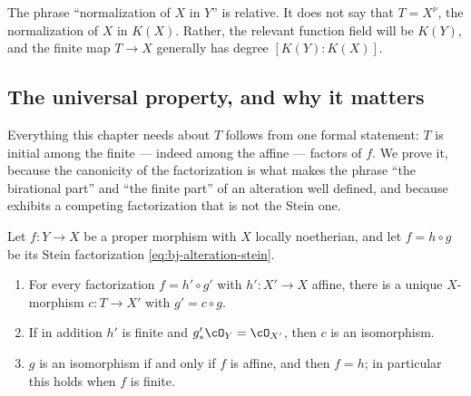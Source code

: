 The phrase ``normalization of $X$ in $Y$'' is relative.
It does not say that $T=X^\nu$, the normalization of $X$ in $K(X)$.
Rather, the relevant function field will be $K(Y)$, and the finite map
$T\to X$ generally has degree $[K(Y):K(X)]$.

\subsection{The universal property, and why it matters}
\label{sec:ch42-stein-universal}

Everything this chapter needs about $T$ follows from one formal statement:
$T$ is initial among the finite --- indeed among the affine --- factors of
$f$.  We prove it, because the canonicity of the factorization is what
makes the phrase ``the birational part'' and ``the finite part'' of an
alteration well defined, and because 
exhibits a competing factorization that is not the Stein one.

\begin{lemma}
\label{lem:ch42-stein-universal}
Let $f:Y\to X$ be a proper morphism with $X$ locally noetherian, and let
$f=h\circ g$ be its Stein factorization \eqref{eq:bj-alteration-stein}.
\begin{enumerate}
\item\label{itm:ch42-su:initial}
      For every factorization $f=h'\circ g'$ with
      $h':X'\to X$ affine, there is a unique $X$-morphism
      $c:T\to X'$ with $g'=c\circ g$.
\item\label{itm:ch42-su:unique}
      If in addition $h'$ is finite and $g'_*\cO_Y=\cO_{X'}$, then
      $c$ is an isomorphism.
\item\label{itm:ch42-su:finite}
      $g$ is an isomorphism if and only if $f$ is affine, and then
      $f=h$; in particular this holds when $f$ is finite.
\end{enumerate}
\end{lemma}

